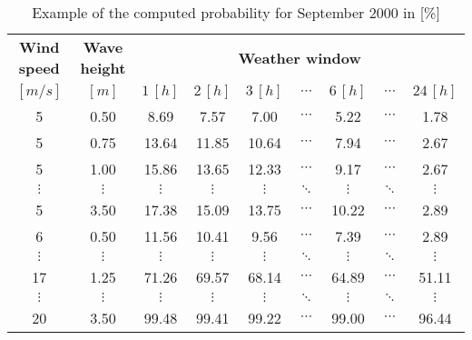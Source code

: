 \begin{table}
\label{tab:proba}
\begin{tabular}{ccccccccc}
\hline
{\bf Wind speed} & {\bf Wave height} & \multicolumn{ 7}{c}{{\bf Weather window}} \\
$[m/s]$      &      $[m]$      &          $1\, [h]$ &          $2\, [h]$ &          $3\, [h]$ &  $\cdots$ & $6\, [h]$  & $\cdots$ &        $24\, [h]$ \\
\hline
5 &       0.50 &       8.69 &       7.57 &       7.00 &  $\cdots$ & 5.22 & $\cdots$ &      1.78 \\
5 &       0.75 &      13.64 &      11.85 &      10.64 &  $\cdots$ & 7.94 & $\cdots$ &      2.67 \\
5 &       1.00 &      15.86 &      13.65 &      12.33 &  $\cdots$ & 9.17 & $\cdots$ &      2.67 \\
 $\vdots$ &  $\vdots$ &  $\vdots$ &  $\vdots$ &  $\vdots$ &  $\ddots$ & $\vdots$ & $\ddots$ &  $\vdots$ \\
5 &       3.50 &      17.38 &      15.09 &      13.75 &  $\cdots$ & 10.22 & $\cdots$ &       2.89 \\
6 &       0.50 &      11.56 &      10.41 &       9.56 &  $\cdots$ & 7.39 & $\cdots$ &      2.89 \\
$\vdots$ &  $\vdots$ &  $\vdots$ &  $\vdots$ &  $\vdots$ & $\ddots$ & $\vdots$ &        $\ddots$ &  $\vdots$ \\
17 & 1.25 & 71.26 & 69.57 & 68.14 & $\cdots$ & 64.89 & $\cdots$ & 51.11 \\
$\vdots$ &  $\vdots$ &  $\vdots$ &  $\vdots$ &  $\vdots$ & $\ddots$ & $\vdots$ &        $\ddots$ &  $\vdots$ \\
20 &       3.50 &      99.48 &      99.41 &      99.22 &  $\cdots$ & 99.00 & $\cdots$ &      96.44 \\
\hline
\end{tabular}  

\caption{Example of the computed probability for September 2000 in [\%]}
\end{table}
